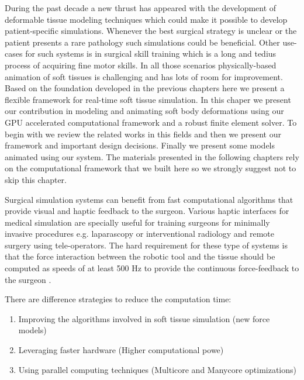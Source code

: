 \label{chapter:finiteelementmethod}
During the past decade a new thrust has appeared with the development of deformable tissue modeling techniques which could make it
possible to develop patient-specific simulations. Whenever the best surgical strategy is unclear or the patient presents a rare
pathology such simulations could be beneficial. Other use-cases for such systems is in surgical skill training which is a long 
and tedius process of acquiring fine motor skills. In all those scenarios physically-based animation of soft tissues is challenging and 
has lots of room for improvement. Based on the foundation developed in the previous chapters here we present a flexible framework for 
real-time soft tissue simulation. In this chaper we present our contribution in modeling and animating soft body deformations using 
our GPU accelerated computational framework and a robust finite element solver. To begin with we review the related works in this
fields and then we present our framework and important design decisions. Finally we present some models animated using our system. 
The materials presented in the following chapters rely on the computational framework that we built here so we strongly suggest
not to skip this chapter.

Surgical simulation systems can benefit from fast computational algorithms that provide visual and haptic feedback to the surgeon. 
Various haptic interfaces for medical simulation are specially useful for training surgeons for minimally invasive procedures e.g.
laparascopy or interventional radiology and remote surgery using tele-operators. The hard requirement for these type of systems is
that the force interaction between the robotic tool and the tissue should be computed as speeds of at least 500 Hz to provide the 
continuous force-feedback to the surgeon \cite{dimaio2005interactive, Otaduy2005}.

There are difference strategies to reduce the computation time:

\begin{enumerate}
 \item Improving the algorithms involved in soft tissue simulation (new force models)
 \item Leveraging faster hardware (Higher computational powe)
 \item Using parallel computing techniques (Multicore and Manycore optimizations)
\end{enumerate}

